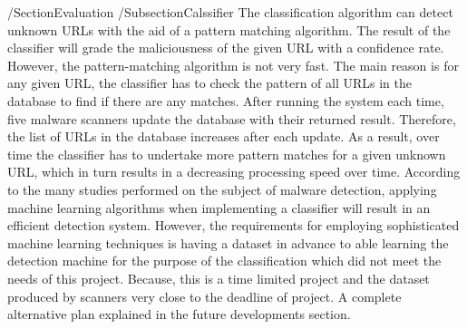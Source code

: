 /Section{Evaluation}
/Subsection{Calssifier}
The classification algorithm can detect unknown URLs with the aid of a pattern matching algorithm. The result of the classifier will grade the maliciousness of the given URL with a confidence rate. However, the pattern-matching algorithm is not very fast. The main reason is for any given URL, the classifier has to check the pattern of all URLs in the database to find if there are any matches. After running the system each time, five malware scanners update the database with their returned result. Therefore, the list of URLs in the database increases after each update. As a result, over time the classifier has to undertake more pattern matches for a given unknown URL, which in turn results in a decreasing processing speed over time.
According to the many studies performed on the subject of malware detection, applying machine learning algorithms when implementing a classifier will result in an efficient detection system. However, the requirements for employing sophisticated machine learning techniques is having a dataset in advance to able learning the detection machine for the purpose of the classification which did not meet the needs of this project. Because, this is a time limited project and the dataset produced by scanners very close to the deadline of project. A complete alternative plan explained in the future developments section. 